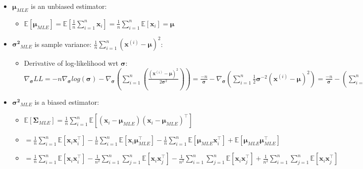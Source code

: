 \begin{itemize}
\begin{itemize}
    \end{itemize}
    \item $\boldsymbol{\mu}_{MLE}$ is an unbiased estimator:
    \begin{itemize}
        \item $\mathbb{E}[\boldsymbol{\mu}_{MLE}] = \mathbb{E}\left[\frac{1}{n} \sum_{i=1}^n \boldsymbol{x}_i\right] 
        = \frac{1}{n} \sum_{i=1}^n \mathbb{E}[\boldsymbol{x}_i] = \boldsymbol{\mu}$
    \end{itemize}
    \item $\boldsymbol{\sigma^2}_{MLE}$ is sample variance: $ \frac{1}{n}\sum_{i=1}^n (\boldsymbol{x}^{(i)} - \boldsymbol{\mu})^2$:
    \begin{itemize}
        \item Derivative of log-likelihood wrt $\boldsymbol{\sigma}$: $\nabla_{\boldsymbol{\sigma}} LL = 
        -n \nabla_{\boldsymbol{\sigma}} log(\boldsymbol{\sigma}) -
        \nabla_{\boldsymbol{\sigma}} (\sum_{i=1}^n (\frac{(\boldsymbol{x}^{(i)} - \boldsymbol{\mu} )^2}{2\boldsymbol{\sigma}^2})) =
        \frac{-n}{\boldsymbol{\sigma}} - \nabla_{\boldsymbol{\sigma}} (\sum_{i=1}^n \frac{1}{2} \boldsymbol{\sigma}^{-2} (\boldsymbol{x}^{(i)} - \boldsymbol{\mu} )^2) = \frac{-n}{\boldsymbol{\sigma}} - (\sum_{i=1}^n -1 \boldsymbol{\sigma}^{-3} (\boldsymbol{x}^{(i)} - \boldsymbol{\mu} )^2) = -n + \sum_{i=1}^n (\frac{ (\boldsymbol{x}^{(i)} - \boldsymbol{\mu} )^2 }{ \boldsymbol{\sigma}^{2} })
        = 0 $
    \end{itemize}
    \item $\boldsymbol{\sigma^2}_{MLE}$ is a biased estimator:
    \begin{itemize}
        \item $\mathbb{E}[\boldsymbol{\Sigma}_{MLE}] = \frac{1}{n} \sum_{i=1}^n \mathbb{E}\left[\left(\boldsymbol{x}_i - \boldsymbol{\mu}_{MLE}\right)\left(\boldsymbol{x}_i - \boldsymbol{\mu}_{MLE}\right)^\intercal\right]$
        \item $= \frac{1}{n} \sum_{i=1}^n \mathbb{E}\left[\boldsymbol{x}_i \boldsymbol{x}_i^\intercal\right] - \frac{1}{n} \sum_{i=1}^n \mathbb{E}\left[\boldsymbol{x}_i \boldsymbol{\mu}_{MLE}^\intercal\right] - \frac{1}{n} \sum_{i=1}^n \mathbb{E}\left[\boldsymbol{\mu}_{MLE} \boldsymbol{x}_i^\intercal\right] + \mathbb{E}\left[\boldsymbol{\mu}_{MLE} \boldsymbol{\mu}_{MLE}^\intercal\right]$
        \item $= \frac{1}{n} \sum_{i=1}^n \mathbb{E}\left[\boldsymbol{x}_i \boldsymbol{x}_i^\intercal\right] - \frac{1}{n^2} \sum_{i=1}^n \sum_{j=1}^n \mathbb{E}\left[\boldsymbol{x}_i \boldsymbol{x}_j^\intercal\right] - \frac{1}{n^2} \sum_{i=1}^n \sum_{j=1}^n \mathbb{E}\left[\boldsymbol{x}_i \boldsymbol{x}_j^\intercal\right] + \frac{1}{n^2} \sum_{i=1}^n \sum_{j=1}^n \mathbb{E}\left[\boldsymbol{x}_i \boldsymbol{x}_j^\intercal\right]$

\end{itemize}
\end{itemize}

